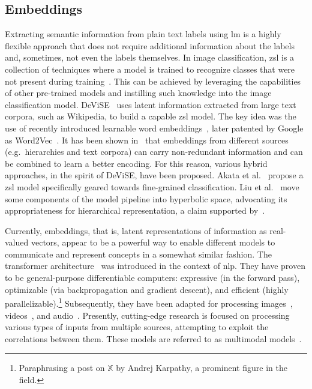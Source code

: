 \subsection{Embeddings}
\label{subsec:embeddings}

Extracting semantic information from plain text labels using \acrshort{lm} is a highly flexible approach that does not require additional information about the labels and, sometimes, not even the labels themselves. In image classification, \acrfull{zsl} is a collection of techniques where a model is trained to recognize classes that were not present during training~\cite{AnIntroductionSoysal2020}. This can be achieved by leveraging the capabilities of other pre-trained models and instilling such knowledge into the image classification model.
DeViSE~\cite{DeviseADeepFrome2013} uses latent information extracted from large text corpora, such as Wikipedia, to build a capable \acrshort{zsl} model. The key idea was the use of recently introduced learnable word embeddings~\cite{EfficientEstimMikolo2013, DistributedRepMikolo2013}, later patented by Google as
Word2Vec~\cite{ComputingNumerMikolo2013}.
It has been shown in~\cite{EvaluationOfOAkata2014, LabelEmbeddingAkata2015} that embeddings from different sources (e.g.\ hierarchies and text corpora) can carry non-redundant information and can be combined to learn a better encoding. For this reason, various hybrid approaches, in the spirit of DeViSE, have been proposed. 
Akata et al.~\cite{EvaluationOfOAkata2014} propose a \acrshort{zsl} model specifically geared towards fine-grained classification.
Liu et al.~\cite{HyperbolicVisuLiuS2020} move some components of the model pipeline into hyperbolic space, advocating its appropriateness for hierarchical representation, a claim supported by~\cite{PoincareEmbeddNickel2017, HyperbolicEntaGanea2018}.

Currently, embeddings, that is, latent representations of information as real-valued vectors, appear to be a powerful way to enable different models to communicate and represent concepts in a somewhat similar fashion. The transformer architecture~\cite{AttentionIsAlVaswan2017} was introduced in the context of \acrfull{nlp}. They have proven to be general-purpose differentiable computers: expressive (in the forward pass), optimizable (via backpropagation and gradient descent), and efficient (highly parallelizable).\footnote{Paraphrasing a post on $\mathbb{X}$ by Andrej Karpathy, a prominent figure in the field.} Subsequently, they have been adapted for processing images~\cite{ImageTransformParmar2018, EndToEndObjeCarion2020, AnImageIsWorDosovi2020}, videos~\cite{VivitAVideoArnab2021, TemporalContexShao2020}, and audio~\cite{NeuralSpeechSLiNa2018, SpeechTransforDong2018, ConformerConvGulati2020}.
Presently, cutting-edge research is focused on processing various types of inputs from multiple sources, attempting to exploit the correlations between them. These models are referred to as multimodal models~\cite{ASurveyOnMulYinS2023}.


